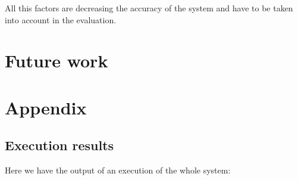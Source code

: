 \documentclass[]{report}
\begin{document}
All this factors are decreasing the accuracy of the system and have to be taken into account in the evaluation.


\section{Future work}




\section*{Appendix}
\subsection*{Execution results}

Here we have the output of an execution of the whole system:


\end{document}
